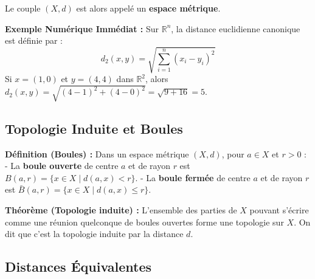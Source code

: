 \documentclass[11pt,a4paper]{article}
\begin{document}
Le couple $(X, d)$ est alors appelé un \textbf{espace métrique}.

\textbf{Exemple Numérique Immédiat :}
Sur $\mathbb{R}^n$, la distance euclidienne canonique est définie par :
$$ d_2(x, y) = \sqrt{\sum_{i=1}^n (x_i - y_i)^2} $$
Si $x = (1, 0)$ et $y = (4, 4)$ dans $\mathbb{R}^2$, alors $d_2(x, y) = \sqrt{(4-1)^2 + (4-0)^2} = \sqrt{9 + 16} = 5$.

\subsection{Topologie Induite et Boules}

\textbf{Définition (Boules) :}
Dans un espace métrique $(X, d)$, pour $a \in X$ et $r > 0$ :
- La \textbf{boule ouverte} de centre $a$ et de rayon $r$ est $B(a, r) = \{ x \in X \mid d(a, x) < r \}$.
- La \textbf{boule fermée} de centre $a$ et de rayon $r$ est $\bar{B}(a, r) = \{ x \in X \mid d(a, x) \le r \}$.

\textbf{Théorème (Topologie induite) :}
L'ensemble des parties de $X$ pouvant s'écrire comme une réunion quelconque de boules ouvertes forme une topologie sur $X$. On dit que c'est la topologie induite par la distance $d$.

\begin{center}
\end{center}

\subsection{Distances Équivalentes}
\end{document}
